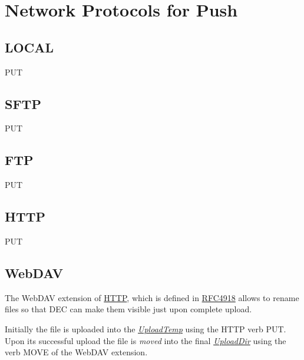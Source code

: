 \documentclass[dec_sum_main.tex]{subfiles}
\begin{document}
\section{Network Protocols for Push}

\subsection{LOCAL}
PUT

\subsection{SFTP}
PUT

\subsection{FTP}
PUT

\subsection{HTTP}
PUT

\subsection{WebDAV}
The WebDAV extension of \href{https://www.w3.org/Protocols/rfc2616/rfc2616-sec9.html}{HTTP}, which is defined in \href{https://tools.ietf.org/html/rfc4918}{RFC4918} allows to rename files so that DEC can make them visible just upon complete upload.

\par
\noindent
Initially the file is uploaded into the \hyperref[UploadTemp]{\textit{UploadTemp}} using the HTTP verb PUT. Upon its successful upload the file is \textit{moved} into the final \hyperref[UploadDir]{\textit{UploadDir}} using the verb MOVE of the WebDAV extension.
\end{document}
